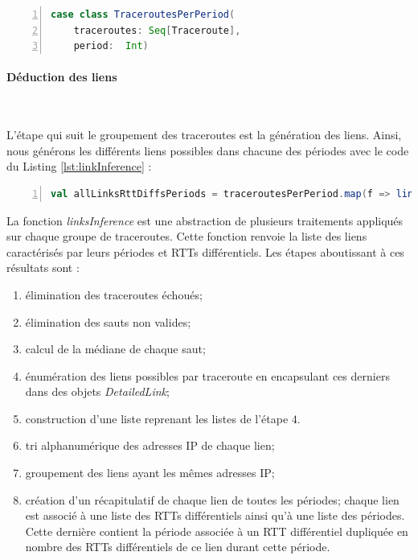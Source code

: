 \begin{lstlisting}[language=scala,firstnumber=1, caption={Définition de la classe TraceroutesPerPeriod },label={lst:classTraceroutesPerPeriod}, basicstyle = \footnotesize,escapechar=|,numbers=left,
stepnumber=1]
case class TraceroutesPerPeriod(
	traceroutes: Seq[Traceroute],
	period:  Int)
\end{lstlisting}

\paragraph{Déduction des liens}~

L'étape qui suit le groupement des traceroutes est la génération des liens. Ainsi, nous générons les différents liens possibles dans chacune des périodes avec le code du Listing \ref{lst:linkInference} :

\begin{lstlisting}[language=scala,firstnumber=1, caption={Etape de déduction des liens},label={lst:linkInference}, basicstyle = \footnotesize,escapechar=|,numbers=left,
stepnumber=1]
val allLinksRttDiffsPeriods = traceroutesPerPeriod.map(f => linksInference(spark, f))
\end{lstlisting}

La fonction \textit{linksInference} est une abstraction de plusieurs traitements appliqués sur chaque groupe de traceroutes.  Cette fonction renvoie
la liste des liens caractérisés par leurs périodes et RTTs différentiels. Les étapes aboutissant à ces résultats  sont : 

\begin{enumerate}
	\item élimination des traceroutes échoués;
	\item élimination des sauts non valides;
	\item calcul de la médiane de chaque saut;
	\item énumération des liens possibles par traceroute en encapsulant ces derniers dans des objets \textit{DetailedLink};
	\item construction d'une liste reprenant les listes de l'étape $4$.
	\item tri alphanumérique des adresses IP de chaque lien;
	\item groupement des liens ayant les mêmes adresses IP;
	\item création d'un récapitulatif de chaque lien de toutes les périodes; chaque lien est associé à une liste des RTTs différentiels ainsi qu'à une liste des périodes. Cette dernière contient la période associée à un RTT différentiel dupliquée en nombre des RTTs différentiels de ce lien durant cette période. 
\end{enumerate}

